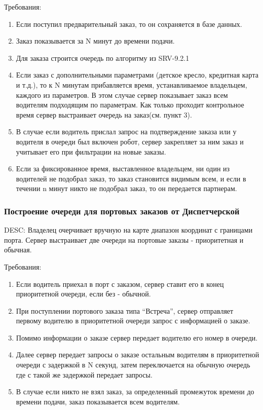 			Требования:

			\begin{enumerate}
				\item{Если поступил предварительный заказ, то он сохраняется в базе данных.}

				\item{Заказ показывается за N минут до времени подачи.}

				\item{Для заказа строится очередь по алгоритму из SRV-9.2.1}

				\item{Если заказ с дополнительными параметрами (детское кресло, кредитная карта и т.д.), то к N минутам прибавляется время, устанавливаемое владельцем, каждого из параметров. В этом случае сервер показывает заказ всем водителям подходящим по параметрам. Как только проходит контрольное время сервер выстраивает очередь на заказ(см. пункт 3).}

				\item{В случае если водитель прислал запрос на подтверждение заказа или у водителя в очереди был включен робот, сервер закрепляет за ним заказ и учитывает его при фильтрации на новые заказы.}

				\item{Если за фиксированное время, выставленное владельцем, ни один из водителей не подобрал заказ, то заказ становится видимым всем, и если в течении n минут никто не подобрал заказ, то он передается партнерам.}
			\end{enumerate}

		\subsubsection{Построение очереди для портовых заказов от Диспетчерской}

			DESC: Владелец очерчивает вручную на карте диапазон координат с границами порта. Сервер выстраивает две очереди на портовые заказы - приоритетная и обычная.

			Требования:

			\begin{enumerate}
				\item{Если водитель приехал в порт с заказом, сервер ставит его в конец приоритетной очереди, если без - обычной.}

				\item{При поступлении портового заказа типа “Встреча”, сервер отправляет первому водителю в приоритетной очереди запрос с информацией о заказе. }

				\item{Помимо информации о заказе сервер передает водителю его номер в очереди.}

				\item{Далее сервер передает запросы о заказе остальным водителям в приоритетной очереди с задержкой в N секунд, затем переключается на обычную очередь где с такой же задержкой передает запросы.}

				\item{В случае если никто не взял заказ, за определенный промежуток времени до времени подачи, заказ показывается всем водителям.}
			\end{enumerate}

